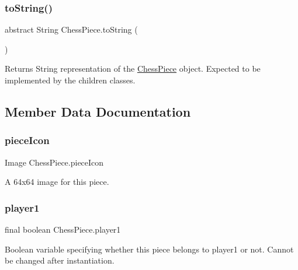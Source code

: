 \subsubsection{\texorpdfstring{to\+String()}{toString()}}
{\footnotesize\ttfamily abstract String Chess\+Piece.\+to\+String (\begin{DoxyParamCaption}{ }\end{DoxyParamCaption})\hspace{0.3cm}{\ttfamily [abstract]}}

\begin{DoxyReturn}{Returns}
String representation of the \mbox{\hyperlink{class_chess_piece}{Chess\+Piece}} object. Expected to be implemented by the children classes. 
\end{DoxyReturn}


\subsection{Member Data Documentation}
\mbox{\label{class_chess_piece_a3216dcf60a0092d90e7a0449bc46db9d}} 
\subsubsection{\texorpdfstring{piece\+Icon}{pieceIcon}}
{\footnotesize\ttfamily Image Chess\+Piece.\+piece\+Icon\hspace{0.3cm}{\ttfamily [protected]}}

A 64x64 image for this piece. \mbox{\label{class_chess_piece_aa8711ff5ce8a45159b9b30c8148a34b2}} 
\subsubsection{\texorpdfstring{player1}{player1}}
{\footnotesize\ttfamily final boolean Chess\+Piece.\+player1\hspace{0.3cm}{\ttfamily [protected]}}

Boolean variable specifying whether this piece belongs to player1 or not. Cannot be changed after instantiation. \mbox{\label{class_chess_piece_ae9f0da2b5fca2557eab359044a7ba1ac}} 
